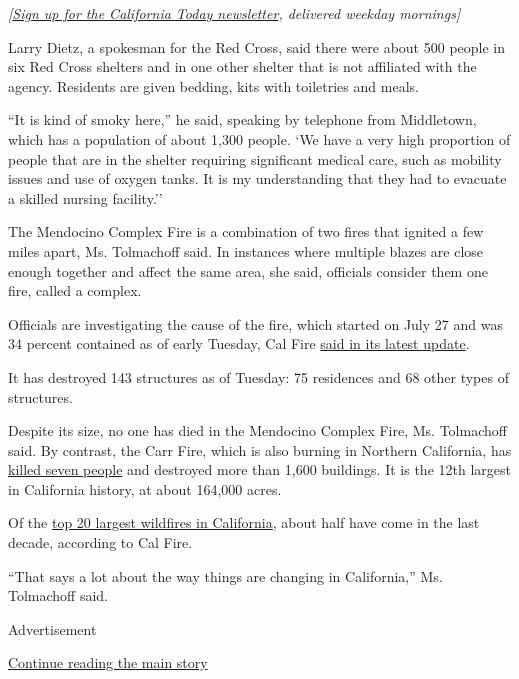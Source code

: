 \emph{{[}}\href{https://www.nytimes3xbfgragh.onion/newsletters/california-today?action=click\&module=Intentional\&pgtype=Article}{\emph{Sign
up for the California Today newsletter}}\emph{, delivered weekday
mornings{]}}

Larry Dietz, a spokesman for the Red Cross, said there were about 500
people in six Red Cross shelters and in one other shelter that is not
affiliated with the agency. Residents are given bedding, kits with
toiletries and meals.

``It is kind of smoky here,'' he said, speaking by telephone from
Middletown, which has a population of about 1,300 people. `We have a
very high proportion of people that are in the shelter requiring
significant medical care, such as mobility issues and use of oxygen
tanks. It is my understanding that they had to evacuate a skilled
nursing facility.''

The Mendocino Complex Fire is a combination of two fires that ignited a
few miles apart, Ms. Tolmachoff said. In instances where multiple blazes
are close enough together and affect the same area, she said, officials
consider them one fire, called a complex.

Officials are investigating the cause of the fire, which started on July
27 and was 34 percent contained as of early Tuesday, Cal Fire
\href{http://cdfdata.fire.ca.gov/admin8327985/cdf/images/incidentfile2175_3899.pdf}{said
in its latest update}.

It has destroyed 143 structures as of Tuesday: 75 residences and 68
other types of structures.

Despite its size, no one has died in the Mendocino Complex Fire, Ms.
Tolmachoff said. By contrast, the Carr Fire, which is also burning in
Northern California, has
\href{https://www.nytimes3xbfgragh.onion/2018/08/05/us/carr-fire-california-wildfires.html}{killed
seven people} and destroyed more than 1,600 buildings. It is the 12th
largest in California history, at about 164,000 acres.

Of the
\href{http://www.fire.ca.gov/communications/downloads/fact_sheets/Top20_Acres.pdf}{top
20 largest wildfires in California}, about half have come in the last
decade, according to Cal Fire.

``That says a lot about the way things are changing in California,'' Ms.
Tolmachoff said.

Advertisement

\protect\hyperlink{after-bottom}{Continue reading the main story}

